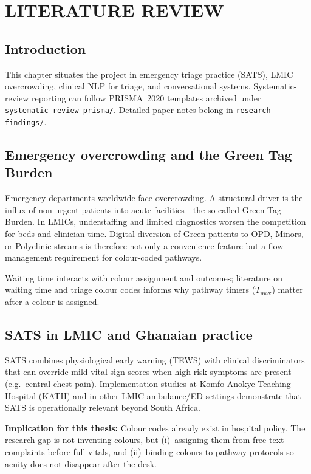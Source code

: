 \chapter{LITERATURE REVIEW}
\label{ch:lit}

\section{Introduction}

This chapter situates the project in emergency triage practice (SATS), LMIC overcrowding, clinical NLP for triage, and conversational systems. Systematic-review reporting can follow PRISMA~2020 templates archived under \texttt{systematic-review-prisma/}. Detailed paper notes belong in \texttt{research-findings/}.

\section{Emergency overcrowding and the Green Tag Burden}

Emergency departments worldwide face overcrowding. A structural driver is the influx of non-urgent patients into acute facilities---the so-called Green Tag Burden. In LMICs, understaffing and limited diagnostics worsen the competition for beds and clinician time. Digital diversion of Green patients to OPD, Minors, or Polyclinic streams is therefore not only a convenience feature but a flow-management requirement for colour-coded pathways.

Waiting time interacts with colour assignment and outcomes; literature on waiting time and triage colour codes informs why pathway timers (\(T_{\max}\)) matter after a colour is assigned.

\section{SATS in LMIC and Ghanaian practice}

SATS combines physiological early warning (TEWS) with clinical discriminators that can override mild vital-sign scores when high-risk symptoms are present (e.g.\ central chest pain). Implementation studies at Komfo Anokye Teaching Hospital (KATH) and in other LMIC ambulance/ED settings demonstrate that SATS is operationally relevant beyond South Africa.

\textbf{Implication for this thesis:} Colour codes already exist in hospital policy. The research gap is not inventing colours, but (i)~assigning them from free-text complaints before full vitals, and (ii)~binding colours to pathway protocols so acuity does not disappear after the desk.

